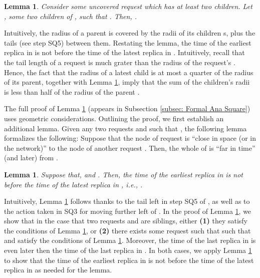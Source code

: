 \documentclass[11pt]{article}
\newtheorem{lem}[theorem]{Lemma}
\begin{document}
\begin{lem}
Consider some uncovered request  which has at least two children.
Let ,  some two children of , such that .
Then,
. \label{lemma:sqr: tj-tk leq 4 radius k}
\label{app:lemma:sqr: tj-tk leq 4 radius k}
\end{lem}
Intuitively, the radius of a parent  is covered by the radii of its children s, plus the tails (see step SQ5) between them.
Restating the lemma,
the time of the earliest replica in  is not before the time of the latest replica in
.
Intuitively,
recall that the tail length of a request is much grater than the radius of the request's .
Hence,  the fact that the
radius of a latest child is at most a quarter of the radius of its parent, together with Lemma \ref{lemma:sqr: tj-tk leq 4 radius k},
imply that the sum of the children’s radii is less than half of the radius of the
parent .









The full proof of Lemma \ref{lemma:sqr: tj-tk leq 4 radius k} (appears in Subsection \ref{subsec: Formal Ana Square}) uses geometric considerations.
Outlining the proof, we first establish an additional lemma.
Given any two requests  and  such that , the following lemma formalizes the following:
Suppose that the node  of request  is ``close in space (or in the network)'' to the node  of another request .
Then, the whole  of  is ``far in time'' (and later) from .

\begin{lem}
\label{lemma:suppose two con hold}
Suppose that,  and .
Then, the time of the earliest replica in  is not before the time of the latest replica in ,
i.e., .
\end{lem}
Intuitively, Lemma \ref{lemma:suppose two con hold} follows thanks to the tail left in step SQ5 of ,
as well as to the action taken in SQ3 for moving  further left of .
\noindent In the proof of Lemma \ref{lemma:sqr: tj-tk leq 4 radius k}, we show that in the case that two requests  and  are siblings,
either
{\bf (1)} they satisfy the conditions of Lemma \ref{lemma:suppose two con hold}, or
{\bf (2)} there exists some request  such that  such that   and  satisfy the conditions of  Lemma \ref{lemma:suppose two con hold}.
Moreover, the time of the last replica in  is even later then the time of the last replica in .
In both cases, we apply Lemma \ref{lemma:suppose two con hold} to show that
the time of the earliest replica in  is not before the time of the latest replica in 
as needed for the lemma.
\end{document}
